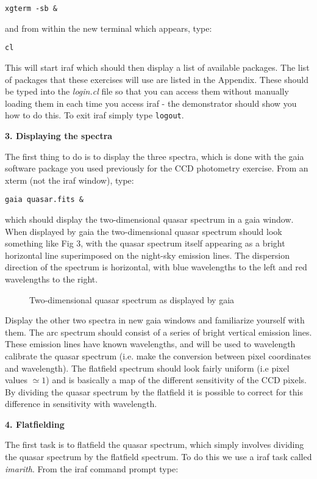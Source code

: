 {\tt \verb,xgterm -sb &,}

\noindent
and from within the new terminal which appears, type:

{\tt cl}

\noindent
This will start {\sc iraf} which should then display a list of available
packages. The list of packages that these exercises will use are listed in the Appendix. These should be typed into the {\it login.cl} file so that you can access them without manually loading them in each time you access {\sc iraf} - the demonstrator should show you how to do this. To exit {\sc iraf} simply type {\tt logout}.

{\large {\bf 3. Displaying the spectra}}

The first thing to do is to display the three spectra, which is done
with the {\sc gaia} software package you used previously for the CCD
photometry exercise. From an xterm (not the {\sc iraf} window), type:

{\tt gaia quasar.fits \&}

which should display the two-dimensional quasar spectrum in a {\sc gaia}
window. When displayed by {\sc gaia} the two-dimensional
quasar spectrum should look something like Fig 3, with the quasar spectrum
itself appearing as a bright horizontal line superimposed on the night-sky
emission lines. The dispersion direction of the spectrum is
horizontal, with blue wavelengths to the left and red wavelengths to
the right.
\begin{figure}
\centerline{}
\caption{Two-dimensional quasar spectrum as displayed by {\sc gaia}}
\end{figure}

Display the other two spectra in new {\sc gaia} windows and familiarize yourself with them. The
arc spectrum should consist of a series of bright vertical emission
lines. These emission lines have known wavelengths, and will be used 
to wavelength calibrate the quasar spectrum (i.e. make the conversion 
between pixel coordinates and wavelength). The flatfield spectrum
should look fairly uniform (i.e pixel values $\simeq1$) and is
basically a map of the different sensitivity 
of the CCD pixels. By dividing the quasar spectrum by the flatfield 
it is possible to correct for this difference in sensitivity with wavelength.


{\large {\bf 4. Flatfielding}}

The first task is to flatfield the quasar spectrum, which simply involves
dividing the quasar spectrum by the flatfield spectrum. To do this we
use a {\sc iraf} task called {\it imarith}. From the {\sc iraf} command prompt type:

